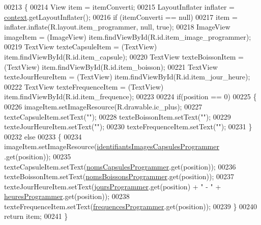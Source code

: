 \begin{DoxyCode}
00213         \{
00214             View item = itemConverti;
00215             LayoutInflater inflater = \hyperlink{classcom_1_1example_1_1ekawa_1_1_ihm_1_1_adaptateur_programmer_aa2573f7d985ef662075730cb36a80f8a}{context}.getLayoutInflater();
00216             \textcolor{keywordflow}{if} (itemConverti == null)
00217                 item = inflater.inflate(R.layout.item\_programmer, null, \textcolor{keyword}{true});
00218             ImageView imageItem = (ImageView) item.findViewById(R.id.item\_image\_programmer);
00219             TextView texteCapsuleItem = (TextView) item.findViewById(R.id.item\_capsule);
00220             TextView texteBoissonItem = (TextView) item.findViewById(R.id.item\_boisson);
00221             TextView texteJourHeureItem = (TextView) item.findViewById(R.id.item\_jour\_heure);
00222             TextView texteFrequenceItem = (TextView) item.findViewById(R.id.item\_frequence);
00223 
00224             \textcolor{keywordflow}{if}(position == 0)
00225             \{
00226                 imageItem.setImageResource(R.drawable.ic\_plus);
00227                 texteCapsuleItem.setText(\textcolor{stringliteral}{""});
00228                 texteBoissonItem.setText(\textcolor{stringliteral}{""});
00229                 texteJourHeureItem.setText(\textcolor{stringliteral}{""});
00230                 texteFrequenceItem.setText(\textcolor{stringliteral}{""});
00231             \}
00232             \textcolor{keywordflow}{else}
00233             \{
00234                 imageItem.setImageResource(\hyperlink{classcom_1_1example_1_1ekawa_1_1_ihm_1_1_adaptateur_programmer_a468b21b654bd1c5cc663e1abf34c62ba}{identifiantsImagesCapsulesProgrammer}
      .get(position));
00235                 texteCapsuleItem.setText(\hyperlink{classcom_1_1example_1_1ekawa_1_1_ihm_1_1_adaptateur_programmer_ae079ecc919f92004afb238e01bb53928}{nomsCapsulesProgrammer}.get(position));
00236                 texteBoissonItem.setText(\hyperlink{classcom_1_1example_1_1ekawa_1_1_ihm_1_1_adaptateur_programmer_a6cf686ef8f8c82dee10e609c7544a8e6}{nomsBoissonsProgrammer}.get(position));
00237                 texteJourHeureItem.setText(\hyperlink{classcom_1_1example_1_1ekawa_1_1_ihm_1_1_adaptateur_programmer_a935bc1f05da276a491141ff78b66dad6}{joursProgrammer}.get(position) + \textcolor{stringliteral}{" - "} + 
      \hyperlink{classcom_1_1example_1_1ekawa_1_1_ihm_1_1_adaptateur_programmer_a114578f4eb2a34e7d3a258635c2ad9f1}{heuresProgrammer}.get(position));
00238                 texteFrequenceItem.setText(\hyperlink{classcom_1_1example_1_1ekawa_1_1_ihm_1_1_adaptateur_programmer_a877b83e1a28ac8f704052df39aad695e}{frequencesProgrammer}.get(position));
00239             \}
00240             \textcolor{keywordflow}{return} item;
00241         \}
\end{DoxyCode}


